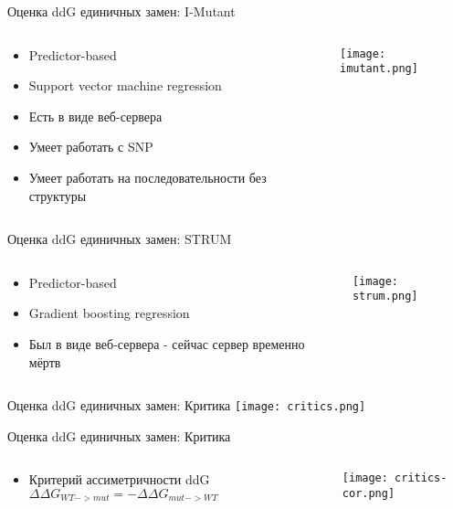 \begin{frame}{Оценка ddG единичных замен: I-Mutant}
    \begin{columns}
\begin{column}{0.5\textwidth}
    \begin{itemize}
        \item Predictor-based
        \item Support vector machine regression
        \item Есть в виде веб-сервера
        \item Умеет работать с SNP
        \item Умеет работать на последовательности без структуры
    \end{itemize}
\end{column}
\begin{column}{0.5\textwidth}
    \texttt{[image: imutant.png]}
\end{column}
\end{columns}
\end{frame}


\begin{frame}{Оценка ddG единичных замен: STRUM}
    \begin{columns}
\begin{column}{0.3\textwidth}
    \begin{itemize}
        \item Predictor-based
        \item Gradient boosting regression
        \item Был в виде веб-сервера - сейчас сервер временно мёртв
    \end{itemize}
\end{column}
\begin{column}{0.7\textwidth}
    \texttt{[image: strum.png]}
\end{column}
\end{columns}
\end{frame}

\begin{frame}{Оценка ddG единичных замен: Критика}
    \texttt{[image: critics.png]}
\end{frame}

\begin{frame}{Оценка ddG единичных замен: Критика}
    \begin{columns}
\begin{column}{0.5\textwidth}
    \begin{itemize}
        \item Критерий ассиметричности ddG
         $\Delta\Delta G_{WT-> mut} = -\Delta\Delta G_{mut-> WT} $
    \end{itemize}
\end{column}
\begin{column}{0.5\textwidth}
    \texttt{[image: critics-cor.png]}
\end{column}
\end{columns}
\end{frame}


